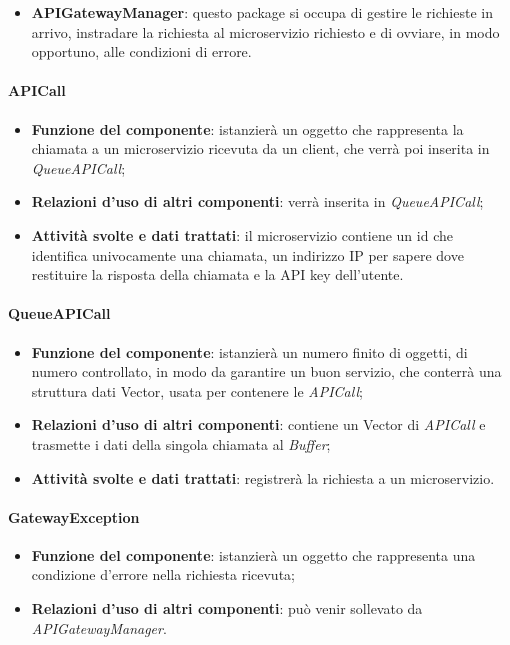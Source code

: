 \begin{itemize}
	\item \textbf{APIGatewayManager}: questo package si occupa di gestire le richieste in arrivo, instradare la richiesta al microservizio richiesto e di ovviare, in modo opportuno, alle condizioni di errore.
\end{itemize}

\paragraph{APICall}
\begin{itemize}
	\item \textbf{Funzione del componente}: istanzierà un oggetto che rappresenta la chiamata a un microservizio ricevuta da un client, che verrà poi inserita in \textit{QueueAPICall};
	\item \textbf{Relazioni d'uso di altri componenti}: verrà inserita in \textit{QueueAPICall};
	\item \textbf{Attività svolte e dati trattati}: il microservizio contiene un id che identifica univocamente una chiamata, un indirizzo IP per sapere dove restituire la risposta della chiamata e la API key dell'utente.
\end{itemize}

\paragraph{QueueAPICall}
\begin{itemize}
	\item \textbf{Funzione del componente}: istanzierà un numero finito di oggetti, di numero controllato, in modo da garantire un buon servizio, che conterrà una struttura dati Vector, usata per contenere le \textit{APICall};
	\item \textbf{Relazioni d'uso di altri componenti}: contiene un Vector di \textit{APICall} e trasmette i dati della singola chiamata al \textit{Buffer};
	\item \textbf{Attività svolte e dati trattati}: registrerà la richiesta a un microservizio.
\end{itemize}

\paragraph{GatewayException}
\begin{itemize}
	\item \textbf{Funzione del componente}: istanzierà un oggetto che rappresenta una condizione d'errore nella richiesta ricevuta;
	\item \textbf{Relazioni d'uso di altri componenti}: può venir sollevato da \textit{APIGatewayManager}.
\end{itemize}

